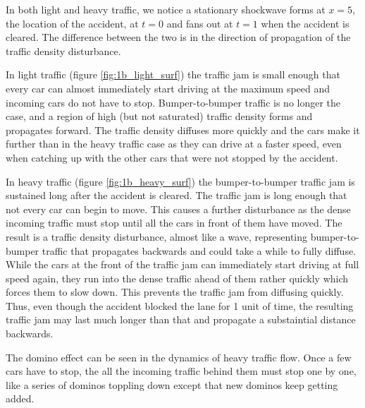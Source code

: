 \documentclass[11pt]{article}
\begin{document}
In both light and heavy traffic, we notice a stationary shockwave forms at $x=5$, the location of the accident, at $t=0$ and fans out at $t=1$ when the accident is cleared. The difference between the two is in the direction of propagation of the traffic density disturbance.

In light traffic (figure \ref{fig:1b_light_surf}) the traffic jam is small enough that every car can almost immediately start driving at the maximum speed and incoming cars do not have to stop. Bumper-to-bumper traffic is no longer the case, and a region of high (but not saturated) traffic density forms and propagates forward. The traffic density diffuses more quickly and the cars make it further than in the heavy traffic case as they can drive at a faster speed, even when catching up with the other cars that were not stopped by the accident.

In heavy traffic (figure \ref{fig:1b_heavy_surf}) the bumper-to-bumper traffic jam is sustained long after the accident is cleared. The traffic jam is long enough that not every car can begin to move. This causes a further disturbance as the dense incoming traffic must stop until all the cars in front of them have moved. The result is a traffic density disturbance, almost like a wave, representing bumper-to-bumper traffic that propagates backwards and could take a while to fully diffuse. While the cars at the front of the traffic jam can immediately start driving at full speed again, they run into the dense traffic ahead of them rather quickly which forces them to slow down. This prevents the traffic jam from diffusing quickly. Thus, even though the accident blocked the lane for 1 unit of time, the resulting traffic jam may last much longer than that and propagate a substaintial distance backwards.

The domino effect can be seen in the dynamics of heavy traffic flow. Once a few cars have to stop, the all the incoming traffic behind them must stop one by one, like a series of dominos toppling down except that new dominos keep getting added.
\end{document}
